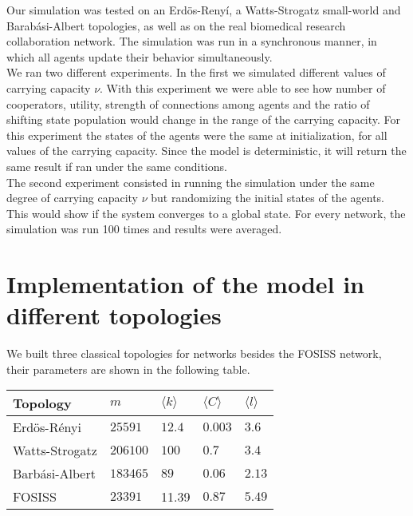 \documentclass[11pt]{article}
\begin{document}
Our simulation was tested on an Erd\"{o}s-Reny\'i, a
Watts-Strogatz small-world and Barab\'asi-Albert topologies, as well
as on the real biomedical research collaboration network. The
simulation was run in a synchronous manner, in which all agents update their
behavior simultaneously. \\   

We ran two different experiments. In the first we simulated different values of
carrying capacity $\nu$. With this experiment we were able to see how number of
cooperators, utility, strength of connections among agents and the ratio of
shifting state population would change in the range of the carrying
capacity. For this experiment the states of the agents were the same at
initialization, for all values of the carrying capacity. Since the model is
deterministic, it will return the same result if ran under the same
conditions.\\ 

The second experiment consisted in running the simulation under the same degree of carrying capacity $\nu$ but randomizing the initial states of the agents. This would show if the system converges to a global state. For every network, the simulation was run 100 times and results were averaged.

\section{Implementation of the model in different topologies}

We built three classical topologies for networks besides the FOSISS network, their parameters are shown in the following table.\\


\begin{tabular}{| l |  l | l |l|l|}
\hline
\bf{Topology}       & $m$              & $\langle k \rangle$          & $\langle C \rangle$      & $\langle l \rangle$ \\ \hline
Erd\"{o}s-R\'enyi  &  $25591$      &  $12.4$        &  $0.003$ & $3.6$  \\ \hline
Watts-Strogatz    &  $206100$   &  $100$         &  $0.7$      & $3.4$  \\ \hline
Barb\'asi-Albert    &  $183465$   &  $89$           &  $0.06$    & $2.13$ \\ \hline
FOSISS                    &  $23391$     &   11.39     &  $0.87$    &  $5.49$ \\ \hline
\end{tabular}\\ 
\end{document}
